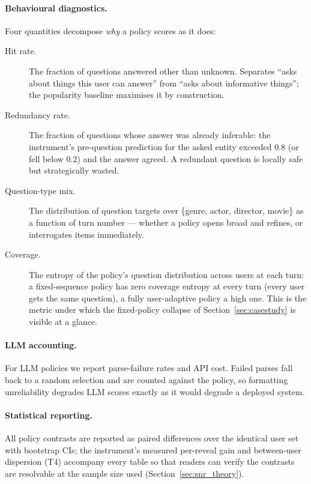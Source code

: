 \documentclass[11pt]{article}
\begin{document}
\paragraph{Behavioural diagnostics.} Four quantities decompose \emph{why}
a policy scores as it does:
\begin{description}
  \item[Hit rate.] The fraction of questions answered other than
  \textsf{unknown}. Separates ``asks about things this user can answer''
  from ``asks about informative things''; the popularity baseline
  maximises it by construction.
  \item[Redundancy rate.] The fraction of questions whose answer was
  already inferable: the instrument's pre-question prediction for the
  asked entity exceeded $0.8$ (or fell below $0.2$) and the answer agreed.
  A redundant question is locally safe but strategically wasted.
  \item[Question-type mix.] The distribution of question targets over
  \{genre, actor, director, movie\} as a function of turn number ---
  whether a policy opens broad and refines, or interrogates items
  immediately.
  \item[Coverage.] The entropy of the policy's question distribution
  across users at each turn: a fixed-sequence policy has zero coverage
  entropy at every turn (every user gets the same question), a fully
  user-adaptive policy a high one. This is the metric under which the
  fixed-policy collapse of Section~\ref{sec:casestudy} is visible at a
  glance.
\end{description}

\paragraph{LLM accounting.} For LLM policies we report parse-failure rates
and API cost. Failed parses fall back to a random selection and are
counted against the policy, so formatting unreliability degrades LLM
scores exactly as it would degrade a deployed system.

\paragraph{Statistical reporting.} All policy contrasts are reported as
paired differences over the identical user set with bootstrap CIs;
the instrument's measured per-reveal gain and between-user dispersion
(T4) accompany every table so that readers can verify the contrasts are
resolvable at the sample size used (Section~\ref{sec:snr_theory}).
\end{document}
